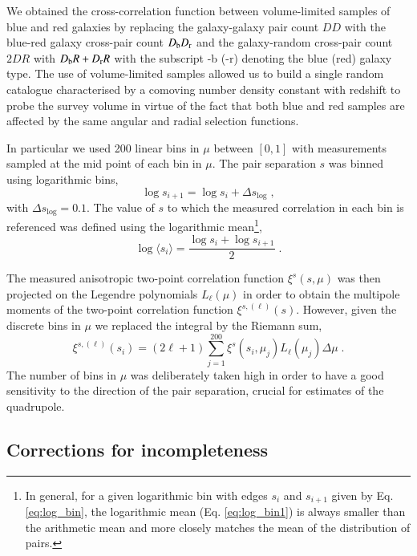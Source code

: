 \documentclass[longauth]{aa}
\def\({\left(}
\def\){\right)}
\begin{document}
We obtained the cross-correlation function between volume-limited samples of blue and red galaxies by replacing the galaxy-galaxy pair count $DD$ with the blue-red galaxy cross-pair count $D_{\rm b}D_{\rm r}$ and the galaxy-random cross-pair count $2DR$ with $D_{\rm b}R+D_{\rm r}R$ with the subscript -b (-r) denoting the blue (red) galaxy type. The use of volume-limited samples allowed us to build a single random catalogue characterised by a comoving number density constant with redshift to probe the survey volume in virtue of the fact that both blue and red samples are affected by the same angular and radial selection functions.

In particular we used 200 linear bins in $\mu$ between $[0,1]$ with measurements sampled at the mid point of each bin in $\mu$. The pair separation $s$ was binned using logarithmic bins,
	\begin{equation}
		\log s_{i+1} = \log s_i + \Delta s_{\log}\; ,			\label{eq:log_bin}
	\end{equation}
with $\Delta s_{\log}=0.1$. The value of $s$ to which the measured correlation in each bin is referenced was defined using the logarithmic mean\footnote{In general, for a given logarithmic bin with edges $s_i$ and $s_{i+1}$ given by Eq. \eqref{eq:log_bin}, the logarithmic mean (Eq. \ref{eq:log_bin1}) is always smaller than the arithmetic mean and more closely matches the mean of the distribution of pairs.},
	\begin{equation}
		\log\langle s_i\rangle = \frac{\log s_i + \log s_{i+1}}{2}\; .																	\label{eq:log_bin1}
	\end{equation}

The measured anisotropic two-point correlation function $\xi^s\(s,\mu\)$ was then projected on the Legendre polynomials $L_{\ell}\(\mu\)$ in order to obtain the multipole moments of the two-point correlation function $\xi^{s,\(\ell\)}\(s\)$. However, given the discrete bins in $\mu$ we replaced the integral by the Riemann sum,
	\begin{equation}
		\xi^{s,\(\ell\)}\(s_i\) = \left(2\ell+1\right)\sum_{j=1}^{200}\xi^s(s_i,\mu_j)L_{\ell}(\mu_j)\Delta\mu\; .						\label{eq:meas_mps}
	\end{equation}
The number of bins in $\mu$ was deliberately taken high in order to have a good sensitivity to the direction of the pair separation, crucial for estimates of the quadrupole.


\subsection{Corrections for incompleteness}\label{incompleteness}
\end{document}
